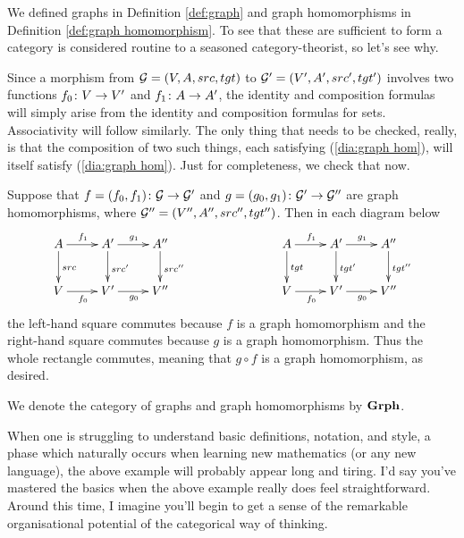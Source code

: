 \documentclass[CT4S-EN-RU]{subfiles}
\begin{document}
\begin{exampleENG}
We defined graphs in Definition \ref{def:graph} and graph homomorphisms in Definition \ref{def:graph homomorphism}. To see that these are sufficient to form a category is considered routine to a seasoned category-theorist, so let's see why. 

Since a morphism from $\mathcal{G}=(V,A,src,tgt)$ to $\mathcal{G}'=(V',A',src',tgt')$ involves two functions $f_0\colon V\rightarrow V'$ and $f_1\colon A\rightarrow A'$, the identity and composition formulas will simply arise from the identity and composition formulas for sets. Associativity will follow similarly. The only thing that needs to be checked, really, is that the composition of two such things, each satisfying (\ref{dia:graph hom}), will itself satisfy (\ref{dia:graph hom}). Just for completeness, we check that now.

Suppose that $f=(f_0,f_1)\colon\mathcal{G}\rightarrow\mathcal{G}'$ and $g=(g_0,g_1)\colon\mathcal{G}'\rightarrow\mathcal{G}''$ are graph homomorphisms, where $\mathcal{G}''=(V'',A'',src'',tgt'')$. Then in each diagram below
\begin{align}\label{dia:graph hom comp}
\xymatrix{A\ar[r]^{f_1}\ar[d]^{src}&A'\ar[r]^{g_1}\ar[d]^{src'}&A''\ar[d]^{src''}\\V\ar[r]_{f_0}&V'\ar[r]_{g_0}&V''
}\hspace{1in}
\xymatrix{A\ar[r]^{f_1}\ar[d]^{tgt}&A'\ar[d]^{tgt'}\ar[r]^{g_1}&A''\ar[d]^{tgt''}\\V\ar[r]_{f_0}&V'\ar[r]_{g_0}&V''
}
\end{align}
the left-hand square commutes because $f$ is a graph homomorphism and the right-hand square commutes because $g$ is a graph homomorphism. Thus the whole rectangle commutes, meaning that $g\circ f$ is a graph homomorphism, as desired. 

We denote the category of graphs and graph homomorphisms by ${\bf Grph}$.
\end{exampleENG}

\begin{exampleRUS}
\end{exampleRUS}

\begin{remarkENG}
When one is struggling to understand basic definitions, notation, and style, a phase which naturally occurs when learning new mathematics (or any new language), the above example will probably appear long and tiring. I'd say you've mastered the basics when the above example really does feel straightforward. Around this time, I imagine you'll begin to get a sense of the remarkable organisational potential of the categorical way of thinking.
\end{remarkENG} 
\end{document}
